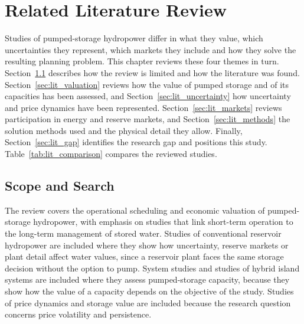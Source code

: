 
\section{Related Literature Review}
\label{sec:literature}

Studies of pumped-storage hydropower differ in what they value, which
uncertainties they represent, which markets they include and how they
solve the resulting planning problem. This chapter reviews these four
themes in turn. Section~\ref{sec:lit_scope} describes how the review is
limited and how the literature was found.
Section~\ref{sec:lit_valuation} reviews how the value of pumped storage
and of its capacities has been assessed, and
Section~\ref{sec:lit_uncertainty} how uncertainty and price dynamics have
been represented. Section~\ref{sec:lit_markets} reviews participation in
energy and reserve markets, and Section~\ref{sec:lit_methods} the
solution methods used and the physical detail they allow. Finally,
Section~\ref{sec:lit_gap} identifies the research gap and positions this
study. Table~\ref{tab:lit_comparison} compares the reviewed studies.

\subsection{Scope and Search}
\label{sec:lit_scope}

The review covers the operational scheduling and economic valuation of
pumped-storage hydropower, with emphasis on studies that link short-term
operation to the long-term management of stored water. Studies of
conventional reservoir hydropower are included where they show how
uncertainty, reserve markets or plant detail affect water values, since a
reservoir plant faces the same storage decision without the option to
pump. System studies and studies of hybrid island systems are included
where they assess pumped-storage capacity, because they show how the
value of a capacity depends on the objective of the study. Studies of
price dynamics and storage value are included because the research
question concerns price volatility and persistence.

